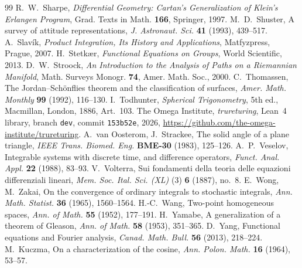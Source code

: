 \documentclass[11pt,reqno]{amsart}
\theoremstyle{definition}
\theoremstyle{remark}
\numberwithin{equation}{section}
\begin{document}
\begin{thebibliography}{99}
 R.~W.~Sharpe, \emph{Differential Geometry: Cartan's Generalization of Klein's Erlangen Program}, Grad. Texts in Math. \textbf{166}, Springer, 1997.
 M.~D.~Shuster, A survey of attitude representations, \emph{J. Astronaut. Sci.} \textbf{41} (1993), 439--517.
 A.~Slav\'ik, \emph{Product Integration, Its History and Applications}, Matfyzpress, Prague, 2007.
 H.~Stetk\ae r, \emph{Functional Equations on Groups}, World Scientific, 2013.
 D.~W.~Stroock, \emph{An Introduction to the Analysis of Paths on a Riemannian Manifold}, Math. Surveys Monogr. \textbf{74}, Amer. Math. Soc., 2000.
 C.~Thomassen, The Jordan--Sch\"onflies theorem and the classification of surfaces, \emph{Amer. Math. Monthly} \textbf{99} (1992), 116--130.
 I.~Todhunter, \emph{Spherical Trigonometry}, 5th ed., Macmillan, London, 1886, Art.~103.
 The Omega Institute, \emph{trureturing}, Lean~4 library, branch \texttt{dev}, commit \texttt{153b52e}, 2026, \url{https://github.com/the-omega-institute/trureturing}.
 A.~van Oosterom, J.~Strackee, The solid angle of a plane triangle, \emph{IEEE Trans. Biomed. Eng.} \textbf{BME-30} (1983), 125--126.
 A.~P.~Veselov, Integrable systems with discrete time, and difference operators, \emph{Funct. Anal. Appl.} \textbf{22} (1988), 83--93.
 V.~Volterra, Sui fondamenti della teoria delle equazioni differenziali lineari, \emph{Mem. Soc. Ital. Sci. (XL)} (3) \textbf{6} (1887), no.~8.
 E.~Wong, M.~Zakai, On the convergence of ordinary integrals to stochastic integrals, \emph{Ann. Math. Statist.} \textbf{36} (1965), 1560--1564.
 H.-C.~Wang, Two-point homogeneous spaces, \emph{Ann. of Math.} \textbf{55} (1952), 177--191.
 H.~Yamabe, A generalization of a theorem of Gleason, \emph{Ann. of Math.} \textbf{58} (1953), 351--365.
 D.~Yang, Functional equations and Fourier analysis, \emph{Canad. Math. Bull.} \textbf{56} (2013), 218--224.
 M.~Kuczma, On a characterization of the cosine, \emph{Ann. Polon. Math.} \textbf{16} (1964), 53--57.

\end{thebibliography}
\end{document}
